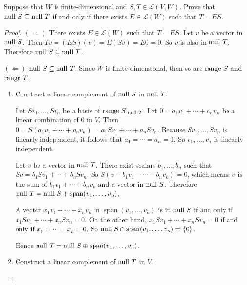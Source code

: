 \begin{exercise}\label{chapter3:sectionB:exercise25}
    Suppose that $W$ is finite-dimensional and $S, T \in \mathcal{L}(V, W)$. Prove that $\operatorname{null}\,{S} \subseteq \operatorname{null}\,{T}$ if and only if there exists $E \in \mathcal{L}(W)$ such that $T = ES$.
\end{exercise}

\begin{proof}
    $(\Rightarrow)$ There exists $E\in\mathcal{L}(W)$ such that $T = ES$. Let $v$ be a vector in $\operatorname{null}\,{S}$. Then $Tv = (ES)(v) = E(Sv) = E0 = 0$. So $v$ is also in $\operatorname{null}\,{T}$. Therefore $\operatorname{null}\,{S}\subseteq\operatorname{null}\,{T}$.

    $(\Leftarrow)$ $\operatorname{null}\,{S}\subseteq\operatorname{null}\,{T}$. Since $W$ is finite-dimensional, then so are $\operatorname{range}\,{S}$ and $\operatorname{range}\,{T}$.

    \begin{enumerate}[label={\textbf{Step \arabic*.}},itemindent={1cm}]
        \item Construct a linear complement of $\operatorname{null}\,{S}$ in $\operatorname{null}\,{T}$.

              Let $Sv_{1}, \ldots, Sv_{n}$ be a basis of $\operatorname{range}\,{S}\vert_{\operatorname{null}\,{T}}$. Let $0 = a_{1}v_{1} + \cdots + a_{n}v_{n}$ be a linear combination of $0$ in $V$. Then $0 = S(a_{1}v_{1} + \cdots + a_{n}v_{n}) = a_{1}Sv_{1} + \cdots + a_{n}Sv_{n}$. Because $Sv_{1}, \ldots, Sv_{n}$ is linearly independent, it follows that $a_{1} = \cdots = a_{n} = 0$. So $v_{1}, \ldots, v_{n}$ is linearly independent.

              Let $v$ be a vector in $\operatorname{null}\,{T}$. There exist scalars $b_{1}, \ldots, b_{n}$ such that $Sv = b_{1}Sv_{1} + \cdots + b_{n}Sv_{n}$. So $S(v - b_{1}v_{1} - \cdots - b_{n}v_{n}) = 0$, which means $v$ is the sum of $b_{1}v_{1} + \cdots + b_{n}v_{n}$ and a vector in $\operatorname{null}\,{S}$. Therefore $\operatorname{null}\,{T} = \operatorname{null}\,{S} + \operatorname{span}(v_{1}, \ldots, v_{n})$.

              A vector $x_{1}v_{1} + \cdots + x_{n}v_{n}$ in $\operatorname{span}(v_{1}, \ldots, v_{n})$ is in $\operatorname{null}\,{S}$ if and only if $x_{1}Sv_{1} + \cdots + x_{n}Sv_{n} = 0$. On the other hand, $x_{1}Sv_{1} + \cdots + x_{n}Sv_{n} = 0$ if and only if $x_{1} = \cdots = x_{n} = 0$. So $\operatorname{null}\,{S}\cap \operatorname{span}(v_{1}, \ldots, v_{n}) = \{0\}$.

              Hence $\operatorname{null}\,{T} = \operatorname{null}\,{S}\oplus\operatorname{span}(v_{1}, \ldots, v_{n})$.
        \item Construct a linear complement of $\operatorname{null}\,{T}$ in $V$.


\end{enumerate}
\end{proof}
